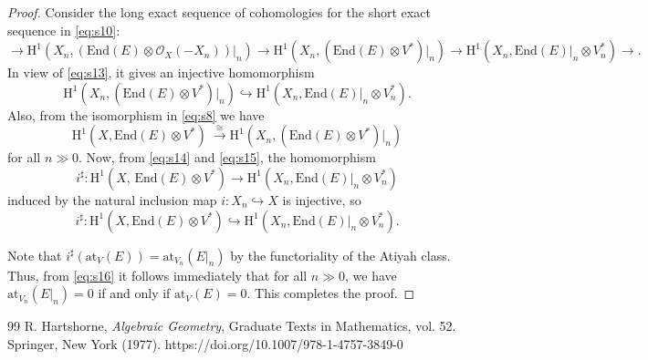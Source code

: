 \documentclass[10pt,a4paper]{amsart}
\begin{document}
\begin{proof}
Consider the long exact sequence of cohomologies for the short exact sequence in \eqref{eq:s10}:
$$
\longrightarrow  \mathrm{H}^1\left(X_n, \left( \mathrm{End} (E) \otimes
\mathcal{O}_X(-X_n) \right)\big\vert_n \right)
 \longrightarrow  \mathrm{H}^1 (X_n, \left( \mathrm{End} (E)\otimes V^* \right)\big\vert_n) 
\longrightarrow  \mathrm{H}^1 (X_n, \mathrm{End} (E)\big\vert_n \otimes V^*_n)  \longrightarrow .
$$
In view of \eqref{eq:s13}, it gives an injective homomorphism
\begin{equation}
\label{eq:s14}
\mathrm{H}^1 (X_n,  \left( \mathrm{End} (E)\otimes V^* \right)\big\vert_n)  \hookrightarrow 
\mathrm{H}^1 (X_n,  \mathrm{End} (E)\big\vert_n \otimes V^*_n).
\end{equation}
Also, from the isomorphism in \eqref{eq:s8} we have 
\begin{equation}
\label{eq:s15}
\mathrm{H}^1(X, \mathrm{End} (E)\otimes V^*)\ \xrightarrow{\, \cong \,}
\mathrm{H}^1 (X_n, \left( \mathrm{End} (E)\otimes V^* \right)\big\vert_n)
\end{equation}
for all $n  \gg  0$. Now, from \eqref{eq:s14} and \eqref{eq:s15}, the homomorphism 
$$
i^{\sharp}  :  \mathrm{H}^1(X,\, \mathrm{End} (E)\otimes V^*)  \longrightarrow
\mathrm{H}^1 (X_n, \mathrm{End} (E)\big\vert_n \otimes V^*_n)
$$
induced by the natural inclusion map $i  :  X_n  \hookrightarrow  X$ is injective, so
\begin{equation}\label{eq:s16}
i^{\sharp}  :  \mathrm{H}^1(X,  \mathrm{End} (E)\otimes V^*)  \hookrightarrow 
\mathrm{H}^1 (X_n,  \mathrm{End} (E)\big\vert_n \otimes V^*_n).
\end{equation}

Note that $i^{\sharp} (\mathrm{at}_V(E))   =  \mathrm{at}_{V_n}(E\big\vert_n)$ by the functoriality of
the Atiyah class. Thus, from \eqref{eq:s16} it follows immediately that for all $n  \gg  0$, we have $\mathrm{at}_{V_n}(E\big\vert_n)  =   0$ if and only if $\mathrm{at}_V(E)  =  0$.
This completes the proof. 
\end{proof}

\begin{thebibliography}{99}
 R. Hartshorne, {\it Algebraic Geometry}, Graduate Texts in Mathematics, vol. 52. Springer, New York (1977). https://doi.org/10.1007/978-1-4757-3849-0
\end{thebibliography}
\end{document}
